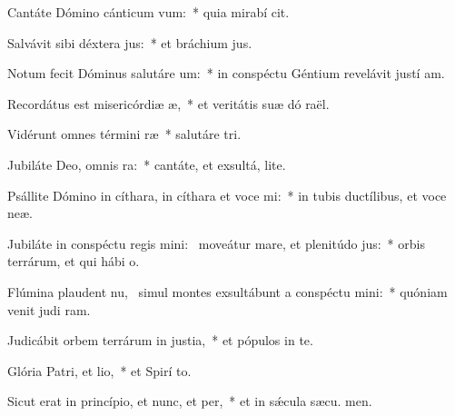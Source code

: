 \item Cantáte Dómino cánticum vum:~* quia mirabí cit.
\item Salvávit sibi déxtera jus:~* et bráchium  jus.
\item Notum fecit Dóminus salutáre um:~* in conspéctu Géntium revelávit justí am.
\item Recordátus est misericórdiæ æ,~* et veritátis suæ dó raël.
\item Vidérunt omnes términi ræ~* salutáre  tri.
\item Jubiláte Deo, omnis ra:~* cantáte, et exsultá,  lite.
\item Psállite Dómino in cíthara, in cíthara et voce mi:~* in tubis ductílibus, et voce  neæ.
\item Jubiláte in conspéctu regis mini:~\pscross{} moveátur mare, et plenitúdo jus:~* orbis terrárum, et qui hábi  o.
\item Flúmina plaudent nu,~\pscross{} simul montes exsultábunt a conspéctu mini:~* quóniam venit judi ram.
\item Judicábit orbem terrárum in justia,~* et pópulos in te.
\item Glória Patri, et lio,~* et Spirí to.
\item Sicut erat in princípio, et nunc, et per,~* et in sǽcula sæcu. men.
